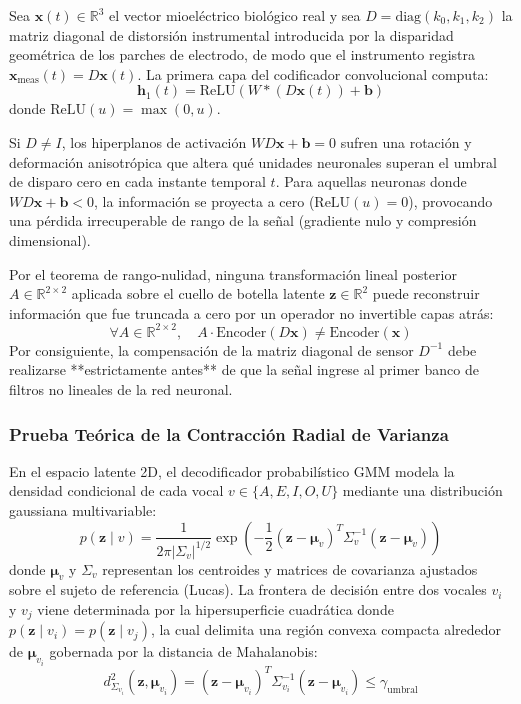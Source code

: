 \documentclass[11pt,a4paper,openany]{book}
\theoremstyle{definition}
\begin{document}
Sea $\mathbf{x}(t) \in \mathbb{R}^3$ el vector mioeléctrico biológico real y sea $D = \text{diag}(k_0, k_1, k_2)$ la matriz diagonal de distorsión instrumental introducida por la disparidad geométrica de los parches de electrodo, de modo que el instrumento registra $\mathbf{x}_{\text{meas}}(t) = D \mathbf{x}(t)$. La primera capa del codificador convolucional computa:
\begin{equation}
\mathbf{h}_1(t) = \text{ReLU}\left( W * (D \mathbf{x}(t)) + \mathbf{b} \right)
\end{equation}
donde $\text{ReLU}(u) = \max(0, u)$. 

Si $D \ne I$, los hiperplanos de activación $W D \mathbf{x} + \mathbf{b} = 0$ sufren una rotación y deformación anisotrópica que altera qué unidades neuronales superan el umbral de disparo cero en cada instante temporal $t$. Para aquellas neuronas donde $W D \mathbf{x} + \mathbf{b} < 0$, la información se proyecta a cero ($\text{ReLU}(u) = 0$), provocando una pérdida irrecuperable de rango de la señal (gradiente nulo y compresión dimensional). 

Por el teorema de rango-nulidad, ninguna transformación lineal posterior $A \in \mathbb{R}^{2 \times 2}$ aplicada sobre el cuello de botella latente $\mathbf{z} \in \mathbb{R}^2$ puede reconstruir información que fue truncada a cero por un operador no invertible capas atrás:
\begin{equation}
\forall A \in \mathbb{R}^{2 \times 2}, \quad A \cdot \text{Encoder}(D \mathbf{x}) \ne \text{Encoder}(\mathbf{x})
\end{equation}
Por consiguiente, la compensación de la matriz diagonal de sensor $D^{-1}$ debe realizarse **estrictamente antes** de que la señal ingrese al primer banco de filtros no lineales de la red neuronal.

\subsubsection{Prueba Teórica de la Contracción Radial de Varianza}
En el espacio latente 2D, el decodificador probabilístico GMM modela la densidad condicional de cada vocal $v \in \{A, E, I, O, U\}$ mediante una distribución gaussiana multivariable:
\begin{equation}
p(\mathbf{z} \mid v) = \frac{1}{2\pi |\Sigma_v|^{1/2}} \exp\left( -\frac{1}{2} (\mathbf{z} - \boldsymbol{\mu}_v)^T \Sigma_v^{-1} (\mathbf{z} - \boldsymbol{\mu}_v) \right)
\end{equation}
donde $\boldsymbol{\mu}_v$ y $\Sigma_v$ representan los centroides y matrices de covarianza ajustados sobre el sujeto de referencia (Lucas). La frontera de decisión entre dos vocales $v_i$ y $v_j$ viene determinada por la hipersuperficie cuadrática donde $p(\mathbf{z} \mid v_i) = p(\mathbf{z} \mid v_j)$, la cual delimita una región convexa compacta alrededor de $\boldsymbol{\mu}_{v_i}$ gobernada por la distancia de Mahalanobis:
\begin{equation}
d_{\Sigma_{v_i}}^2(\mathbf{z}, \boldsymbol{\mu}_{v_i}) = (\mathbf{z} - \boldsymbol{\mu}_{v_i})^T \Sigma_{v_i}^{-1} (\mathbf{z} - \boldsymbol{\mu}_{v_i}) \le \gamma_{\text{umbral}}
\end{equation}
\end{document}
